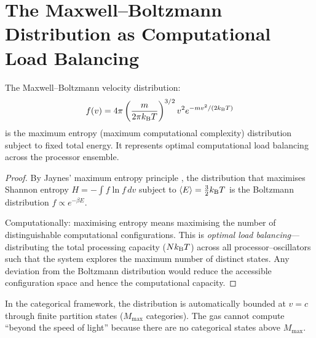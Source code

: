 \section{The Maxwell--Boltzmann Distribution as Computational Load Balancing}
\label{sec:maxwell_computation}

\begin{theorem}
\label{thm:maxwell_compute}
The Maxwell--Boltzmann velocity distribution:
\begin{equation}
    f(v) = 4\pi\left(\frac{m}{2\pi k_{\mathrm{B}} T}\right)^{3/2} v^2 e^{-mv^2/(2k_{\mathrm{B}} T)}
\end{equation}
is the maximum entropy (maximum computational complexity) distribution subject to fixed total energy. It represents optimal computational load balancing across the processor ensemble.
\end{theorem}

\begin{proof}
By Jaynes' maximum entropy principle \cite{jaynes1957}, the distribution that maximises Shannon entropy $H = -\int f \ln f \, dv$ subject to $\langle E \rangle = \tfrac{3}{2}k_{\mathrm{B}} T$ is the Boltzmann distribution $f \propto e^{-\beta E}$.

Computationally: maximising entropy means maximising the number of distinguishable computational configurations. This is \emph{optimal load balancing}---distributing the total processing capacity ($Nk_{\mathrm{B}} T$) across all processor--oscillators such that the system explores the maximum number of distinct states. Any deviation from the Boltzmann distribution would reduce the accessible configuration space and hence the computational capacity.
\end{proof}

\begin{remark}
In the categorical framework, the distribution is automatically bounded at $v = c$ through finite partition states ($M_{\max}$ categories). The gas cannot compute ``beyond the speed of light'' because there are no categorical states above $M_{\max}$.
\end{remark}


